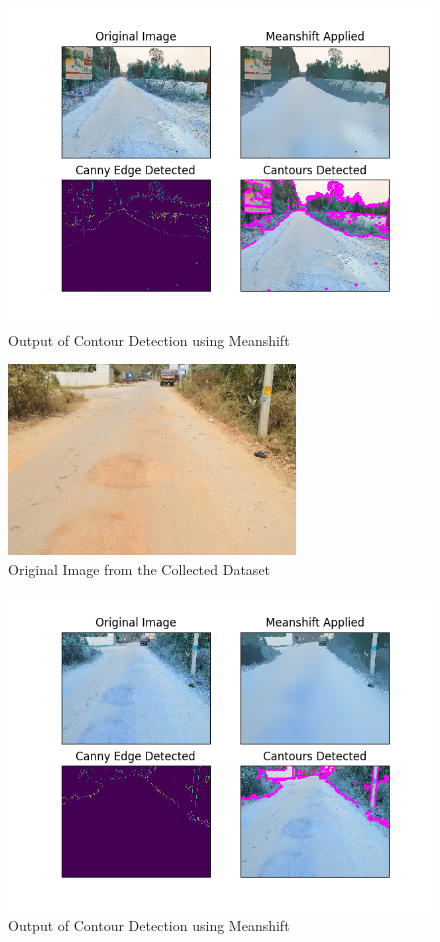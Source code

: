 \documentclass[12pt,a4paper]{article}
\begin{document}
\begin{itemize}
    \begin{figure}[ht!]
        \centering
        \includegraphics[width = 5in]{images/meanshift_1.png}
        \caption{Output of Contour Detection using Meanshift}
    \end{figure}
    \pagebreak

    
    \begin{figure}[ht!]
        \centering
        \includegraphics[width = 3in]{images/road_cam_14.jpg}
        \caption{Original Image from the Collected Dataset}
    \end{figure}

    \begin{figure}[ht!]
        \centering
        \includegraphics[width = 5in]{images/meanshift_3.png}
        \caption{Output of Contour Detection using Meanshift}
    \end{figure}
    \pagebreak
    

\end{itemize}
\end{document}
